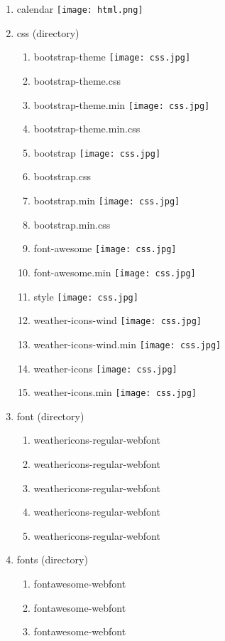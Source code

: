 \begin{enumerate}
\item calendar \texttt{[image: html.png]}
\item css (directory)
\begin{enumerate}
    \item bootstrap-theme \texttt{[image: css.jpg]}
    \item bootstrap-theme.css
    \item bootstrap-theme.min \texttt{[image: css.jpg]}
    \item bootstrap-theme.min.css
    \item bootstrap \texttt{[image: css.jpg]}
    \item bootstrap.css
    \item bootstrap.min \texttt{[image: css.jpg]}
    \item bootstrap.min.css
    \item font-awesome \texttt{[image: css.jpg]}
    \item font-awesome.min \texttt{[image: css.jpg]}
    \item style \texttt{[image: css.jpg]}
    \item weather-icons-wind \texttt{[image: css.jpg]}
    \item weather-icons-wind.min \texttt{[image: css.jpg]}
    \item weather-icons \texttt{[image: css.jpg]}
    \item weather-icons.min \texttt{[image: css.jpg]}
\end{enumerate}
\item font (directory)
\begin{enumerate}
    \item weathericons-regular-webfont
    \item weathericons-regular-webfont
    \item weathericons-regular-webfont
    \item weathericons-regular-webfont
    \item weathericons-regular-webfont
\end{enumerate}
\item fonts (directory)
\begin{enumerate}
    \item fontawesome-webfont
    \item fontawesome-webfont
    \item fontawesome-webfont

\end{enumerate}
\end{enumerate}
